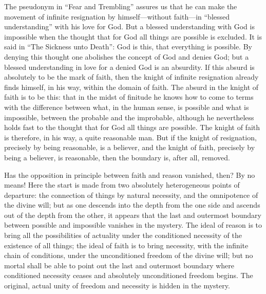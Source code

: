\documentclass[12pt,a4paper,openany]{book}
\newcommand{\opage}[1]{\marginnote{\footnotesize\textit{[#1]}}}
\begin{document}
The pseudonym in ``Fear and Trembling'' assures us that he can make the
movement of infinite resignation by himself---without faith---in
``blessed understanding'' with his love for God. But a blessed
understanding with God is impossible when the thought that for God all
things are possible is excluded. It is said in ``The Sickness unto
Death'': God is this, that everything is possible. By denying this
thought one abolishes the concept of God and denies God; but a blessed
understanding in love for a denied God is an absurdity. If this absurd is
absolutely to be the mark of faith, then the \opage{87}knight of infinite
resignation already finds himself, in his way, within the domain of
faith. The absurd in the knight of faith is to be this: that in the midst
of finitude he knows how to come to terms with the difference between
what, in the human sense, is possible and what is impossible, between the
probable and the improbable, although he nevertheless holds fast to the
thought that for God all things are possible. The knight of faith is
therefore, in his way, a quite reasonable man. But if the knight of
resignation, precisely by being reasonable, is a believer, and the knight
of faith, precisely by being a believer, is reasonable, then the boundary
is, after all, removed.

Has the opposition in principle between faith and reason vanished, then?
By no means! Here the start is made from two absolutely heterogeneous
points of departure: the connection of things by natural necessity, and
the omnipotence of the divine will; but as one descends into the depth
from the one side and ascends out of the depth from the other, it appears
that the last and outermost boundary between possible and impossible
vanishes in the mystery. The ideal of reason is to bring all the
possibilities of actuality under the conditioned necessity of the
existence of all things; the ideal of faith is to bring necessity, with
the infinite chain of conditions, under the unconditioned freedom of the
divine will; but no mortal shall be able to point out the last and
outermost boundary where conditioned necessity ceases and absolutely
unconditioned freedom begins. The original, actual unity of freedom and
necessity is hidden in the mystery.
\end{document}
